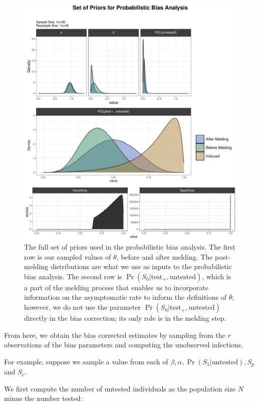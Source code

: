 \documentclass[12pt,twoside]{smiththesis}
\begin{document}
~
~
~
~
~
~
~
~
~
~
~
~
~
~
~
~
~
~
~
\begin{figure}
\includegraphics[width=1\linewidth]{figure/full-set-priors} \caption{\label{fig:melded-all-together}The full set of priors used in the probabilistic bias analysis. The first row is our sampled values of $\theta$, before and after melding. The post-melding distributions are what we use as inputs to the probabilistic bias analysis. The second row is $\Pr(S_0|\text{test}_+, \text{untested})$, which is a part of the melding process that enables us to incorporate information on the asymptomatic rate to inform the definitions of $\theta$; however, we do not use the parameter $\Pr(S_0|\text{test}_+, \text{untested})$ directly in the bias correction; its only role is in the melding step.}\label{fig:unnamed-chunk-58}
\end{figure}
From here, we obtain the bias corrected estimates by sampling from the \(r\) observations of the bias parameters and computing the unobserved infections.

For example, suppose we sample a value from each of \(\beta,\alpha,\Pr(S_1|\text{untested}), S_p\) and \(S_e\).

We first compute the number of untested individuals as the population size \(N\) minus the number tested:
\end{document}
